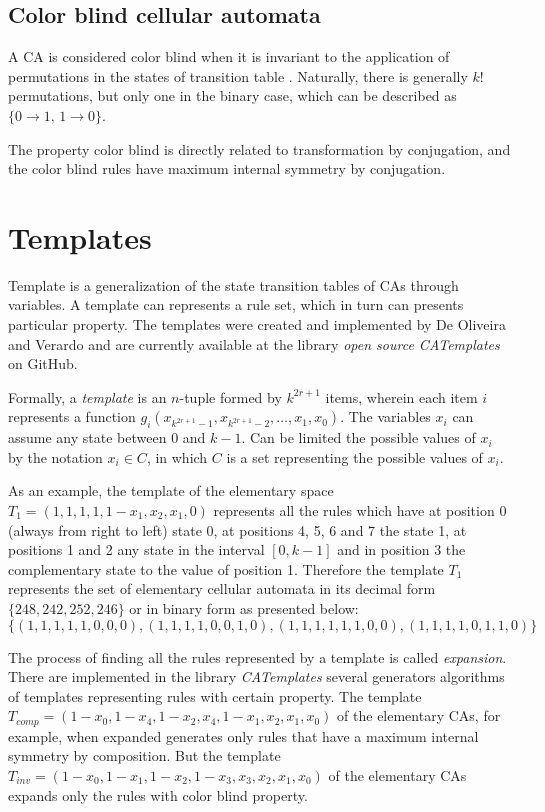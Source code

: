 \documentclass{llncs}
\begin{document}
\subsection{Color blind cellular automata}
A CA is considered color blind when it is invariant to the application of permutations in the states of transition table \cite{salo2013color}. Naturally, there is generally $k!$ permutations, but only one in the binary case, which can be described as $\{0 \to 1 ,\, 1 \to 0\}$. 

The property color blind is directly related to transformation by conjugation, and the color blind rules have maximum internal symmetry by conjugation.

\section{Templates}
\label{sec:templates}
Template is a generalization of the state transition tables of CAs through variables. A template can represents a rule set, which in turn can presents particular property. The templates were created and implemented by De Oliveira and Verardo \cite{deOliveira2014} and are currently available at the library \textit{open source CATemplates} \cite{CATemplates} on GitHub.

Formally, a \textit{template} is an $n$-tuple formed by $k^{2r+1}$ items, wherein each item $i$ represents a function $g_i(x_{k^{2r+1}-1},x_{k^{2r+1}-2},\dots,x_1,x_0)$. The variables $x_i$ can assume any state between 0 and $k-1$. Can be limited the possible values of $x_i$ by the notation $x_i \in C$, in which $C$ is a set representing the possible values of $x_i$. %

As an example, the template of the elementary space $T_1 = (1,1,1,1,1-x_1,x_2,x_1,0)$ represents all the rules which have at position 0 (always from right to left) state 0, at positions 4, 5, 6 and 7 the state 1, at positions 1 and 2 any state in the interval $ [0, k-1] $ and in position 3 the complementary state to the value of position 1. Therefore the template $T_1$ represents the set of elementary cellular automata in its decimal form $\{248,242,252,246\}$ or in binary form as presented below:
\begin{displaymath}
\{(1,1,1,1,1,0,0,0),(1,1,1,1,0,0,1,0),(1,1,1,1,1,1,0,0),(1,1,1,1,0,1,1,0)\}
\end{displaymath}

The process of finding all the rules represented by a template is called \textit{expansion}. There are implemented in the library \textit{CATemplates} \cite{CATemplates} several generators algorithms of templates representing rules with certain property. %
 The template $T_{comp} = (1 - x_0, 1 - x_4, 1 - x_2, x_4, 1 - x_1, x_2, x_1, x_0)$ of the elementary CAs, for example, when expanded generates only rules that have a maximum internal symmetry by composition. But the template $T_{inv} = (1 - x_0, 1 - x_1, 1 - x_2, 1 - x_3, x_3, x_2, x_1, x_0)$ of the elementary CAs expands only the rules with color blind property.
\end{document}
